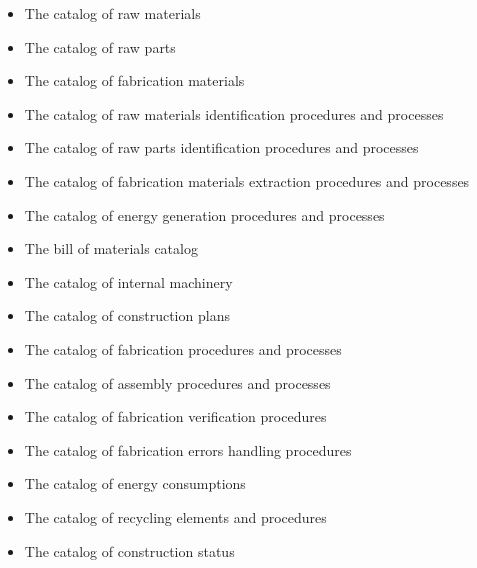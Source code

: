 \begin{itemize}
\item The catalog of raw materials
\item The catalog of raw parts
\item The catalog of fabrication materials
\item The catalog of raw materials identification procedures and
processes
\item The catalog of raw parts identification procedures and processes
\item The catalog of fabrication materials extraction procedures and
processes
\item The catalog of energy generation procedures and processes
\item The bill of materials catalog
\item The catalog of internal machinery
\item The catalog of construction plans
\item The catalog of fabrication procedures and processes
\item The catalog of assembly procedures and processes
\item The catalog of fabrication verification procedures
\item The catalog of fabrication errors handling procedures
\item The catalog of energy consumptions
\item The catalog of recycling elements and procedures
\item The catalog of construction status
\end{itemize}

\bigskip



